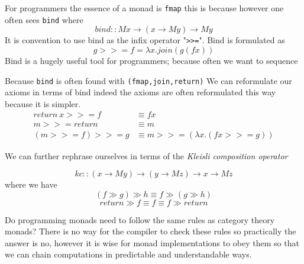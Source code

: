 \documentclass[a4paper,10pt]{article}
\theoremstyle{definition}
\begin{document}
For programmers the essence of a monad is \texttt{fmap}
this is because
however one often sees \texttt{bind} where
\begin{equation}
    bind :: M x \rightarrow (x \rightarrow M y) \rightarrow M y
\end{equation}
It is convention to use bind as the infix operator "\texttt{>>=}".
Bind is formulated as
\begin{equation}
    g >>= f = \lambda x. join (g (f x))
\end{equation}
Bind is a hugely useful tool for programmers;
because often we want to sequence

Because \texttt{bind} is often found with \texttt{(fmap,join,return)}
We can reformulate our axioms in terms of bind
indeed the axioms are often reformulated this way because it is simpler.
\begin{equation}
  \begin{split}
      return\ x >>= f     &\equiv f x \\
             m >>= return &\equiv m   \\
      (m >>= f) >>= g     &\equiv m >>= (\lambda x.(fx >>= g))
  \end{split}
\end{equation}

We can further rephrase ourselves in terms
of the \textit{Kleisli composition operator}

\begin{equation}
    kc :: (x \rightarrow M y) \rightarrow (y \rightarrow M z) \rightarrow x \rightarrow M z
\end{equation}
where we have
\begin{equation}
    (f \gg g) \gg h \equiv f \gg (g \gg h)
\end{equation}
\begin{equation}
    return \gg f \equiv f \equiv f \gg return
\end{equation}

Do programming monads need to follow the same rules as category theory monads?
There is no way for the compiler to check these rules so practically the answer is no,
however it is wise for monad implementations to obey them so that
we can chain computations in predictable and understandable ways.
\end{document}
